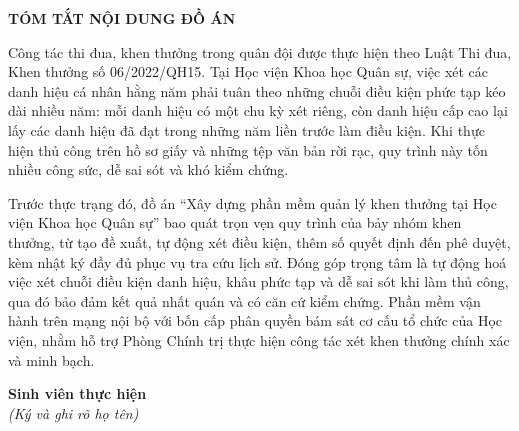 \documentclass[../DoAn.tex]{subfiles}
\begin{document}
\begin{center}
    \Large{\textbf{TÓM TẮT NỘI DUNG ĐỒ ÁN}}\\
\end{center}
\vspace{1cm}

Công tác thi đua, khen thưởng trong quân đội được thực hiện theo Luật Thi đua, Khen thưởng số 06/2022/QH15.
Tại Học viện Khoa học Quân sự, việc xét các danh hiệu cá nhân hằng năm phải tuân theo những chuỗi điều kiện phức tạp kéo dài nhiều năm: mỗi danh hiệu có một chu kỳ xét riêng, còn danh hiệu cấp cao lại lấy các danh hiệu đã đạt trong những năm liền trước làm điều kiện.
Khi thực hiện thủ công trên hồ sơ giấy và những tệp văn bản rời rạc, quy trình này tốn nhiều công sức, dễ sai sót và khó kiểm chứng.

Trước thực trạng đó, đồ án ``Xây dựng phần mềm quản lý khen thưởng tại Học viện Khoa học Quân sự'' bao quát trọn vẹn quy trình của bảy nhóm khen thưởng, từ tạo đề xuất, tự động xét điều kiện, thêm số quyết định đến phê duyệt, kèm nhật ký đầy đủ phục vụ tra cứu lịch sử.
Đóng góp trọng tâm là tự động hoá việc xét chuỗi điều kiện danh hiệu, khâu phức tạp và dễ sai sót khi làm thủ công, qua đó bảo đảm kết quả nhất quán và có căn cứ kiểm chứng.
Phần mềm vận hành trên mạng nội bộ với bốn cấp phân quyền bám sát cơ cấu tổ chức của Học viện, nhằm hỗ trợ Phòng Chính trị thực hiện công tác xét khen thưởng chính xác và minh bạch.

\vspace{1cm}
\begin{flushright}
    \textbf{Sinh viên thực hiện}\\
    \textit{(Ký và ghi rõ họ tên)}
\end{flushright}
\end{document}
